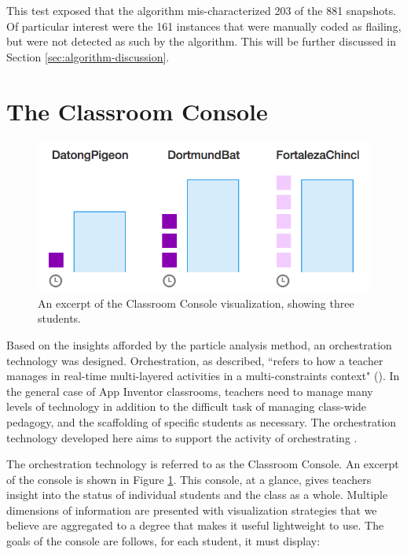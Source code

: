 This test exposed that the algorithm mis-characterized 203 of the 881 snapshots. Of particular interest were the 161 instances that were manually coded as flailing, but were not detected as such by the algorithm. This will be further discussed in Section \ref{sec:algorithm-discussion}.





\section{The Classroom Console}
\label{sec:classroom-console}

\begin{figure}
  \centering
      \includegraphics{images/ch4-console-demo}
  \caption[Excerpt of the Classroom Console]{An excerpt of the Classroom Console visualization, showing three students.}
  \label{fig:console-demo}
\end{figure}


Based on the insights afforded by the particle analysis method, an orchestration technology was designed. Orchestration, as \citeauthor{dillenbourg2012design} described, ``refers to how a teacher manages in real-time multi-layered activities in a multi-constraints context" (\citeyear{dillenbourg2012design}). In the general case of App Inventor classrooms, teachers need to manage many levels of technology in addition to the difficult task of managing class-wide pedagogy, and the scaffolding of specific students as necessary. The orchestration technology developed here aims to support the activity of orchestrating \citep{tchounikine2013clarifying}.

The orchestration technology is referred to as the Classroom Console. An excerpt of the console is shown in Figure \ref{fig:console-demo}. This console, at a glance, gives teachers insight into the status of individual students and the class as a whole. Multiple dimensions of information are presented with visualization strategies that we believe are aggregated to a degree that makes it useful lightweight to use. The goals of the console are follows, for each student, it must display:

